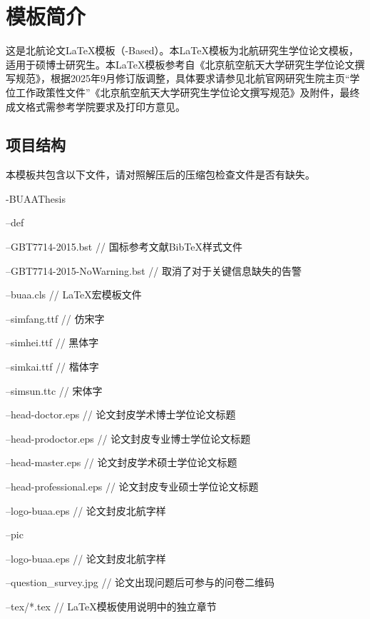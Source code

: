 \chapter{模板简介}

这是北航论文\LaTeX{}模板（\CTeX{}-Based）\BUAAThesis{}。本\LaTeX{}模板为北航研究生学位论文模板，适用于硕博士研究生。本\LaTeX{}模板参考自《北京航空航天大学研究生学位论文撰写规范》，根据2025年9月修订版调整，具体要求请参见北航官网研究生院主页“学位工作政策性文件”《北京航空航天大学研究生学位论文撰写规范》及附件，最终成文格式需参考学院要求及打印方意见。


\section{项目结构}

本模板共包含以下文件，请对照解压后的压缩包检查文件是否有缺失。

-BUAAThesis

\quad--def

\quad \quad--GBT7714-2015.bst      // 国标参考文献BibTeX样式文件 

\quad \quad--GBT7714-2015-NoWarning.bst // 取消了对于关键信息缺失的告警

\quad \quad--buaa.cls                  // LaTeX宏模板文件

\quad \quad--simfang.ttf               // 仿宋字

\quad \quad--simhei.ttf                // 黑体字

\quad \quad--simkai.ttf                // 楷体字

\quad \quad--simsun.ttc                // 宋体字

\quad \quad--head-doctor.eps       // 论文封皮学术博士学位论文标题

\quad \quad--head-prodoctor.eps    // 论文封皮专业博士学位论文标题

\quad \quad--head-master.eps       // 论文封皮学术硕士学位论文标题

\quad \quad--head-professional.eps // 论文封皮专业硕士学位论文标题

\quad \quad--logo-buaa.eps         // 论文封皮北航字样

\quad--pic

\quad \quad--logo-buaa.eps         // 论文封皮北航字样

\quad \quad--question\_survey.jpg   // 论文出现问题后可参与的问卷二维码

\quad--tex/*.tex                 // LaTeX模板使用说明中的独立章节

